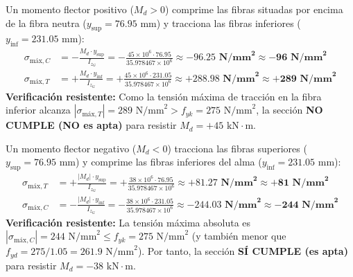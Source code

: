 {    Un momento flector positivo ($M_d > 0$) comprime las fibras situadas por encima de la fibra neutra ($y_{\text{sup}} = 76.95\text{ mm}$) y tracciona las fibras inferiores ($y_{\text{inf}} = 231.05\text{ mm}$):
    \begin{align}
        \sigma_{\text{máx},C} & = -\frac{M_d \cdot y_{\text{sup}}}{I_{z_G}} = -\frac{45 \times 10^6 \cdot 76.95}{35.978467 \times 10^6} \approx \mathbf{-96.25\text{ N/mm}^2} \approx \mathbf{-96\text{ N/mm}^2}    \\
        \sigma_{\text{máx},T} & = +\frac{M_d \cdot y_{\text{inf}}}{I_{z_G}} = +\frac{45 \times 10^6 \cdot 231.05}{35.978467 \times 10^6} \approx \mathbf{+288.98\text{ N/mm}^2} \approx \mathbf{+289\text{ N/mm}^2}
    \end{align}
    \textbf{Verificación resistente:} Como la tensión máxima de tracción en la fibra inferior alcanza $|\sigma_{\text{máx},T}| = 289\text{ N/mm}^2 > f_{yk} = 275\text{ N/mm}^2$, la sección \textbf{NO CUMPLE (NO es apta)} para resistir $M_d = +45\text{ kN}\cdot\text{m}$.


    Un momento flector negativo ($M_d < 0$) tracciona las fibras superiores ($y_{\text{sup}} = 76.95\text{ mm}$) y comprime las fibras inferiores del alma ($y_{\text{inf}} = 231.05\text{ mm}$):
    \begin{align}
        \sigma_{\text{máx},T} & = +\frac{|M_d| \cdot y_{\text{sup}}}{I_{z_G}} = +\frac{38 \times 10^6 \cdot 76.95}{35.978467 \times 10^6} \approx \mathbf{+81.27\text{ N/mm}^2} \approx \mathbf{+81\text{ N/mm}^2}    \\
        \sigma_{\text{máx},C} & = -\frac{|M_d| \cdot y_{\text{inf}}}{I_{z_G}} = -\frac{38 \times 10^6 \cdot 231.05}{35.978467 \times 10^6} \approx \mathbf{-244.03\text{ N/mm}^2} \approx \mathbf{-244\text{ N/mm}^2}
    \end{align}
    \textbf{Verificación resistente:} La tensión máxima absoluta es $|\sigma_{\text{máx},C}| = 244\text{ N/mm}^2 \le f_{yk} = 275\text{ N/mm}^2$ (y también menor que $f_{yd} = 275/1.05 = 261.9\text{ N/mm}^2$). Por tanto, la sección \textbf{SÍ CUMPLE (es apta)} para resistir $M_d = -38\text{ kN}\cdot\text{m}$.

}
